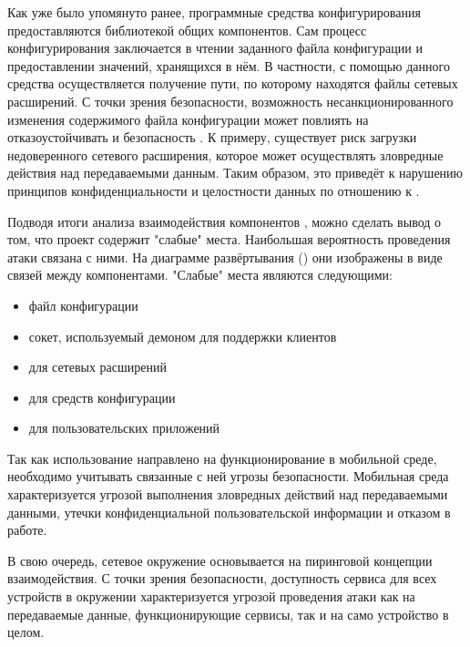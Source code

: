 %
Как уже было упомянуто ранее, программные средства конфигурирования \PeerHood предоставляются библиотекой общих компонентов. 
%
Сам процесс конфигурирования заключается в чтении заданного файла конфигурации и предоставлении значений, хранящихся в нём. 
%
В частности, с помощью данного средства осуществляется получение пути, по которому находятся файлы сетевых расширений. 
%
С точки зрения безопасности, возможность несанкционированного изменения содержимого файла конфигурации может повлиять на отказоустойчивать и безопасность \PeerHood. 
%
К примеру, существует риск загрузки недоверенного сетевого расширения, которое может осуществлять зловредные действия над передаваемыми данным.
%
Таким образом, это приведёт к нарушению принципов конфиденциальности и целостности данных по отношению к \PeerHood. 

%
Подводя итоги анализа взаимодействия компонентов \PeerHood, можно сделать вывод о том, что проект содержит "слабые" места. Наибольшая вероятность проведения атаки связана с ними. На диаграмме развёртывания \PeerHood () они изображены в виде связей между компонентами. "Слабые" места \PeerHood являются следующими:
\begin{itemize}
	\setlength{\itemsep}{0pt}%

	\item файл конфигурации
	\item сокет, используемый демоном для поддержки клиентов
	\item {} для сетевых расширений
	\item {} для средств конфигурации
	\item {} для пользовательских приложений
\end{itemize}

%
Так как использование \PeerHood направлено на функционирование в мобильной среде, необходимо учитывать связанные с ней угрозы безопасности. 
%
Мобильная среда характеризуется угрозой выполнения зловредных действий над передаваемыми данными, утечки конфиденциальной пользовательской информации и отказом  в работе. 

%
В свою очередь, сетевое окружение \PeerHood основывается на пиринговой концепции взаимодействия. 
%
С точки зрения безопасности, доступность сервиса для всех устройств в окружении характеризуется угрозой проведения атаки как на передаваемые данные, функционирующие сервисы, так и на само устройство в целом. 

